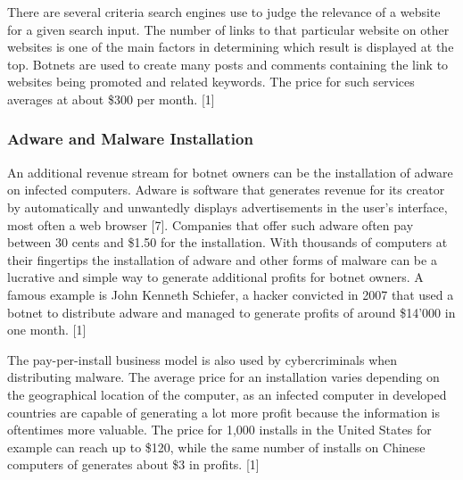 There are several criteria search engines use to judge the relevance of a website for a given search input. The number of links to that particular website on other websites is one of the main factors in determining which result is displayed at the top. Botnets are used to create many posts and comments containing the link to websites being promoted and related keywords. The price for such services averages at about \$300 per month. [1]

		\subsubsection{Adware and Malware Installation}
		An additional revenue stream for botnet owners can be the installation of adware on infected computers. Adware is software that generates revenue for its creator by automatically and unwantedly displays advertisements in the user's interface, most often a web browser [7]. Companies that offer such adware often pay between 30 cents and \$1.50 for the installation. With thousands of computers at their fingertips the installation of adware and other forms of malware can be a lucrative and simple way to generate additional profits for botnet owners. A famous example is John Kenneth Schiefer, a hacker convicted in 2007 that used a botnet to distribute adware and managed to generate profits of around \$14'000 in one month. [1]

The pay-per-install business model is also used by cybercriminals when distributing malware. The average price for an installation varies depending on the geographical location of the computer, as an infected computer in developed countries are capable of generating a lot more profit because the information is oftentimes more valuable. The price for 1,000 installs in the United States for example can reach up to \$120, while the same number of installs on Chinese computers of generates about \$3 in profits. [1]

